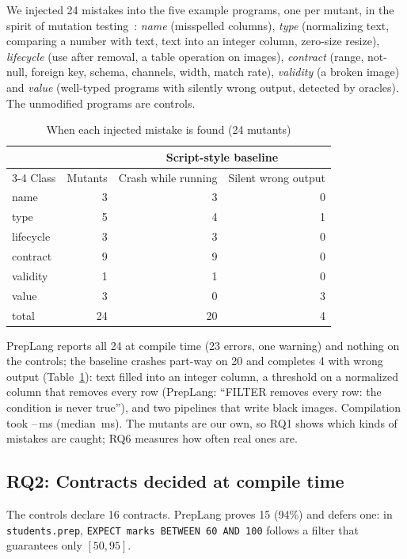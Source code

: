 \documentclass[conference]{IEEEtran}
\begin{document}
We injected 24 mistakes into the five example programs, one per mutant, in the spirit of mutation
testing~\cite{jia2011}: \emph{name} (misspelled columns), \emph{type} (normalizing text, comparing a
number with text, text into an integer column, zero-size resize), \emph{lifecycle} (use after
removal, a table operation on images), \emph{contract} (range, not-null, foreign key, schema,
channels, width, match rate), \emph{validity} (a broken image) and \emph{value} (well-typed programs
with silently wrong output, detected by oracles). The unmodified programs are controls.

\begin{table}[t]
\caption{When each injected mistake is found (24 mutants)}
\label{tab:rq1}
\centering
\footnotesize
\begin{tabular}{@{}lrrr@{}}
\toprule
& & \multicolumn{2}{c}{Script-style baseline} \\
\cmidrule(l){3-4}
Class & Mutants & Crash while running & Silent wrong output \\
\midrule
name       & 3 & 3 & 0 \\
type       & 5 & 4 & 1 \\
lifecycle  & 3 & 3 & 0 \\
contract   & 9 & 9 & 0 \\
validity   & 1 & 1 & 0 \\
value      & 3 & 0 & 3 \\
\midrule
total      & 24 & 20 & 4 \\
\bottomrule
\end{tabular}
\end{table}

PrepLang reports all 24 at compile time (23 errors, one warning) and nothing on the controls; the
baseline crashes part-way on 20 and completes 4 with wrong output (Table~\ref{tab:rq1}): text
filled into an integer column, a threshold on a normalized column that removes every row (PrepLang:
``FILTER removes every row: the condition is never true''), and two pipelines that write black
images. Compilation took \RqOneMsMin--\RqOneMsMax\,ms (median \RqOneMsMed\,ms). The mutants are our
own, so RQ1 shows which kinds of mistakes are caught; RQ6 measures how often real ones are.

\subsection{RQ2: Contracts decided at compile time}

The controls declare 16 contracts. PrepLang proves 15 (94\%) and defers one: in
\texttt{students.prep}, \texttt{EXPECT marks BETWEEN 60 AND 100} follows a filter that guarantees
only $[50, 95]$.
\end{document}
